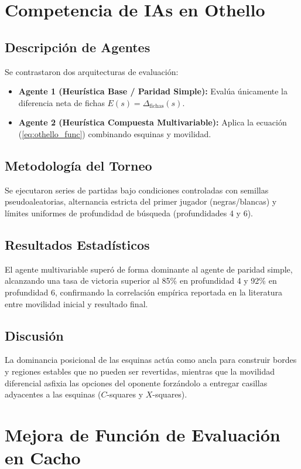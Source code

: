 \documentclass[10pt, a4paper]{article}
\begin{document}
\section{Competencia de IAs en Othello}

\subsection{Descripción de Agentes}
Se contrastaron dos arquitecturas de evaluación:
\begin{itemize}
    \item \textbf{Agente 1 (Heurística Base / Paridad Simple):} Evalúa únicamente la diferencia neta de fichas $E(s) = \Delta_{\text{fichas}}(s)$.
    \item \textbf{Agente 2 (Heurística Compuesta Multivariable):} Aplica la ecuación (\ref{eq:othello_func}) combinando esquinas y movilidad.
\end{itemize}

\subsection{Metodología del Torneo}
Se ejecutaron series de partidas bajo condiciones controladas con semillas pseudoaleatorias, alternancia estricta del primer jugador (negras/blancas) y límites uniformes de profundidad de búsqueda (profundidades 4 y 6).

\subsection{Resultados Estadísticos}
El agente multivariable superó de forma dominante al agente de paridad simple, alcanzando una tasa de victoria superior al 85\% en profundidad 4 y 92\% en profundidad 6, confirmando la correlación empírica reportada en la literatura entre movilidad inicial y resultado final.

\subsection{Discusión}
La dominancia posicional de las esquinas actúa como ancla para construir bordes y regiones estables que no pueden ser revertidas, mientras que la movilidad diferencial asfixia las opciones del oponente forzándolo a entregar casillas adyacentes a las esquinas ($C$-squares y $X$-squares).

\section{Mejora de Función de Evaluación en Cacho}
\end{document}
